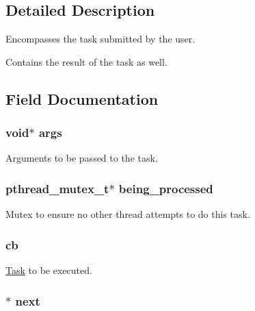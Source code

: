 \subsection{Detailed Description}
Encompasses the task submitted by the user. 

Contains the result of the task as well. 

\subsection{Field Documentation}
\hypertarget{struct_task_add0eb34e0cef9e763462cf9080f9be0a}{}
\subsubsection[{args}]{\setlength{\rightskip}{0pt plus 5cm}void$\ast$ args}\label{struct_task_add0eb34e0cef9e763462cf9080f9be0a}


Arguments to be passed to the task. 

\hypertarget{struct_task_a985c44ad446f8eb8a9ac6958682f28e0}{}
\subsubsection[{being\+\_\+processed}]{\setlength{\rightskip}{0pt plus 5cm}pthread\+\_\+mutex\+\_\+t$\ast$ being\+\_\+processed}\label{struct_task_a985c44ad446f8eb8a9ac6958682f28e0}


Mutex to ensure no other thread attempts to do this task. 

\hypertarget{struct_task_a70806280c684914c6f1e1b9eb1b248c4}{}
\subsubsection[{cb}]{ cb}\label{struct_task_a70806280c684914c6f1e1b9eb1b248c4}


\hyperlink{struct_task}{Task} to be executed. 

\hypertarget{struct_task_afc791d22abed6d81e714bb3993c31223}{}
\subsubsection[{next}]{$\ast$ next}\label{struct_task_afc791d22abed6d81e714bb3993c31223}


